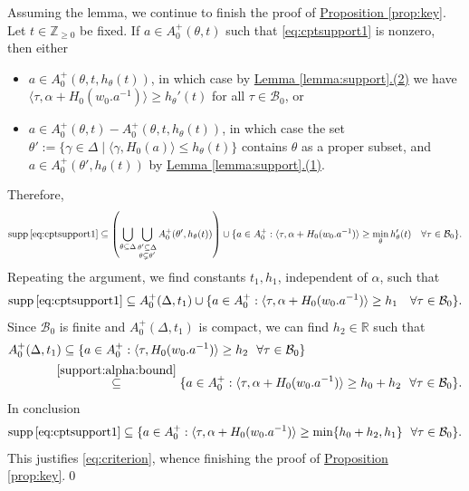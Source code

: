 \documentclass[10pt]{amsart}
\theoremstyle{definition}
\numberwithin{equation}{section}
\DeclareMathOperator{\supp}{\mathrm{supp}}
\numberwithin{equation}{subsection}
\newcommand{\RR}{\mathbb{R}}
\newcommand{\calB}{\mathcal{B}}
\begin{document}
Assuming the lemma, we continue to finish the proof of \hyperref[prop:key]{Proposition \ref{prop:key}}. Let $t\in\mathbb{Z}_{\geq 0}$ be fixed. If $a\in A_0^+(\theta,t)$ such that \eqref{eq:cptsupport1} is nonzero, then either
\begin{itemize}
    \item $a\in A_0^+(\theta,t,h_\theta(t))$, in which case by \hyperref[lemma:support]{Lemma \ref{lemma:support}.(2)} we have  $\langle\tau,\alpha+H_0(w_0.a^{-1})\rangle\geq h_\theta'(t)$ for all $\tau\in\mathcal{B}_0$, or
    \item $a\in A_0^+(\theta,t) - A_0^+(\theta,t,h_\theta(t))$, in which case the set $\theta':=\{\gamma\in\Delta \mid \langle\gamma,H_0(a)\rangle\leq h_\theta(t)\}$ contains $\theta$ as a proper subset, and $a\in A_0^+(\theta',h_\theta(t))$ by \hyperref[lemma:support]{Lemma \ref{lemma:support}.(1)}.
\end{itemize}
Therefore,
\begin{align*}
    \supp\eqref{eq:cptsupport1}\subseteq \left(\bigcup_{\theta\subseteq\Delta}\bigcup_{\substack{\theta'\subseteq\Delta\\\theta\subsetneq\theta'}}A_0^+(\theta',h_\theta(t))\right) \cup \{a\in A_0^+: \langle \tau,\alpha+H_0(w_0.a^{-1})\rangle\ge \min_\theta h'_{\theta}(t)\quad  \forall \tau\in \calB_0 \}.
\end{align*}
Repeating the argument, we find constants $t_1,h_1$, independent of $\alpha$, such that
\begin{align*}
    \supp\eqref{eq:cptsupport1} \subseteq A_0^+(\Delta,t_1) \cup \{a\in A_0^+: \langle \tau,\alpha+H_0(w_0.a^{-1})\rangle\ge h_1\quad  \forall \tau\in \calB_0 \}.
\end{align*}
Since $\mathcal{B}_0$ is finite and $A_0^+(\Delta,t_1)$ is compact, we can find $h_2\in\RR$ such that
\begin{align*}
    A_0^+(\Delta,t_1) &\subseteq \{a\in A_0^+ : \langle\tau,H_0(w_0.a^{-1})\rangle \geq h_2\,\,\,\,\forall\tau\in\mathcal{B}_0\}\\
    &\!\!\!\!\overset{\eqref{support:alpha:bound}}{\subseteq}\{a\in A_0^+ : \langle\tau,\alpha+H_0(w_0.a^{-1})\rangle \geq h_0+h_2\,\,\,\,\forall\tau\in\mathcal{B}_0\}.
\end{align*}
In conclusion
\begin{align*}
    \supp\eqref{eq:cptsupport1} \subseteq \{a\in A_0^+ : \langle\tau,\alpha+H_0(w_0.a^{-1})\rangle \geq \min\{h_0+h_2,h_1\}\,\,\,\,\forall\tau\in\mathcal{B}_0\}.
\end{align*}
This justifies \eqref{eq:criterion}, whence finishing the proof of \hyperref[prop:key]{Proposition \ref{prop:key}}.\qed
\end{document}

